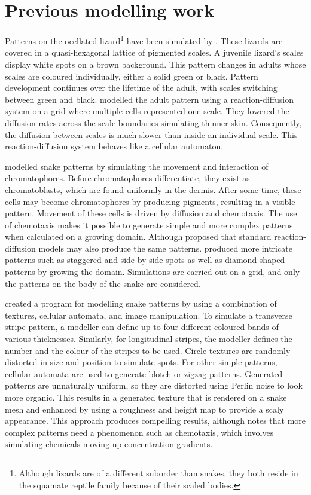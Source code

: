 \section{Previous modelling work}
Patterns on the ocellated lizard\footnote{Although lizards are of a different suborder than snakes, they both reside in the squamate reptile family because of their scaled bodies.} have been simulated by \citet{manukyan2017}. These lizards are covered in a quasi-hexagonal lattice of pigmented scales. A juvenile lizard's scales display white spots on a brown background. This pattern changes in adults whose scales are coloured individually, either a solid green or black. Pattern development continues over the lifetime of the adult, with scales switching between green and black. \citet{manukyan2017} modelled the adult pattern using a reaction-diffusion system on a grid where multiple cells represented one scale. They lowered the diffusion rates across the scale boundaries simulating thinner skin. Consequently, the diffusion between scales is much slower than inside an individual scale. This reaction-diffusion system behaves like a cellular automaton.

\citet{murray1991} modelled snake patterns by simulating the movement and interaction of chromatophores. Before chromatophores differentiate, they exist as chromatoblasts, which are found uniformly in the dermis. After some time, these cells may become chromatophores by producing pigments, resulting in a visible pattern. Movement of these cells is driven by diffusion and chemotaxis. The use of chemotaxis makes it possible to generate simple and more complex patterns when calculated on a growing domain. Although \citet{murray1991} proposed that standard reaction-diffusion models may also produce the same patterns. \citet{murray1991} produced more intricate patterns such as staggered and side-by-side spots as well as diamond-shaped patterns by growing the domain. Simulations are carried out on a grid, and only the patterns on the body of the snake are considered.

\citet{pinheiro2017} created a program for modelling snake patterns by using a combination of textures, cellular automata, and image manipulation. To simulate a transverse stripe pattern, a modeller can define up to four different coloured bands of various thicknesses. Similarly, for longitudinal stripes, the modeller defines the number and the colour of the stripes to be used. Circle textures are randomly distorted in size and position to simulate spots. For other simple patterns, cellular automata are used to generate blotch or zigzag patterns. Generated patterns are unnaturally uniform, so they are distorted using Perlin noise to look more organic. This results in a generated texture that is rendered on a snake mesh and enhanced by using a roughness and height map to provide a scaly appearance. This approach produces compelling results, although \citet{pinheiro2017} notes that more complex patterns need a phenomenon such as chemotaxis, which involves simulating chemicals moving up concentration gradients.

